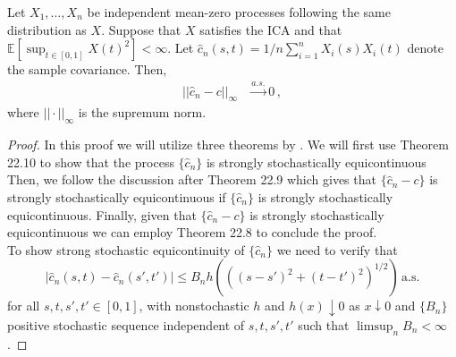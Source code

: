 \begin{theorem}\label{thm:UniformConvergenceKernel}
    Let $X_1, \dots, X_n$ be independent mean-zero processes following the same distribution as $X$.
    Suppose that $X$ satisfies the ICA and that $\mathbb{E}[\sup_{t \in [0, 1]} X(t)^2] < \infty$. Let
    $\hat{c}_n(s, t) = 1/n \sum_{i = 1}^n X_i(s) X_i(t)$ denote the sample covariance. Then,
    \begin{align}
        || \hat{c}_n - c ||_\infty &\overset{a.s.}{\to} 0 \,,
    \end{align}
    where $|| \cdot ||_\infty$ is the supremum norm.
\end{theorem}
\begin{proof}
    In this proof we will utilize three theorems by \cite{davidson2021}. We will first use Theorem
    22.10 to show that the process $\{\hat{c}_n\}$ is strongly stochastically equicontinuous
    Then, we follow the discussion after Theorem 22.9 which gives that
    $\{\hat{c}_n - c\}$ is strongly stochastically equicontinuous if $\{\hat{c}_n\}$ is strongly
    stochastically equicontinuous. Finally, given that $\{\hat{c}_n - c\}$ is strongly
    stochastically equicontinuous we can employ Theorem 22.8 to conclude the proof.\\

    \noindent To show strong stochastic equicontinuity of $\{\hat{c}_n\}$ we need to verify that
    \[
        |\hat{c}_n(s, t) - \hat{c}_n(s', t')| \leq B_n h\left(((s - s')^2 + (t -
        t')^2)^{1/2}\right) \, \text{a.s.}
    \]
    for all $s, t, s', t' \in [0, 1]$, with nonstochastic $h$ and $h(x) \downarrow 0$ as $x
    \downarrow 0$ and $\{B_n\}$ positive stochastic sequence independent of $s, t, s', t'$ such that
    $\limsup_n B_n < \infty$.


\end{proof}
